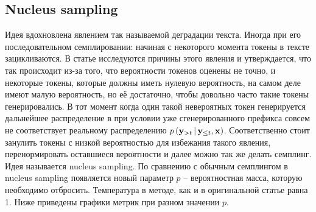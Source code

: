 \documentclass[a4paper, 12pt]{extarticle}
\begin{document}
\subsection{Nucleus sampling}
Идея вдохновлена явлением так называемой деградации текста. Иногда при его последовательном семплировании: начиная с некоторого момента токены в тексте зацикливаются. В статье \cite{nucleus-sampling} исследуются причины этого явления и утверждается, что так происходит из-за того, что вероятности токенов оценены не точно, и некоторые токены, которые должны иметь нулевую вероятность, на самом деле имеют малую вероятность, но её достаточно, чтобы довольно часто такие токены генерировались. В тот момент когда один такой невероятных токен генерируется дальнейшее распределение в при условии уже сгенерированного префикса совсем не соответствует реальному распределению $p \, (\bold{y}_{>t} \, | \, \bold{y}_{\leq t}, \bold{x})$. Соответственно стоит занулить токены с низкой вероятностью для избежания такого явления, перенормировать оставшиеся вероятности и далее можно так же делать семплинг. Идея называется nucleus sampling. По сравнению с обычным семплингом в nucleus sampling появляется новый параметр $p$ -- вероятностная масса, которую необходимо отбросить. Температура в методе, как и в оригинальной статье равна 1. Ниже приведены графики метрик при разном значении $p$.
\end{document}
